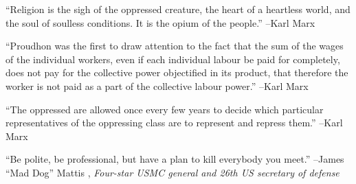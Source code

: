 \documentclass{article}%
\begin{document}
\linebreak%
\vspace{1mm}%
\begin{minipage}{\textwidth}%
\flushleft%
“Religion is the sigh of the oppressed creature, the heart of a heartless world, and the soul of soulless conditions. It is the opium of the people.”%
\linebreak%
\vspace{1mm}%
–Karl Marx%
\linebreak%
\vspace{1mm}%
\end{minipage}%
\linebreak%
\vspace{1mm}%
\begin{minipage}{\textwidth}%
\flushleft%
“Proudhon was the first to draw attention to the fact that the sum of the wages of the individual workers, even if each individual labour be paid for completely, does not pay for the collective power objectified in its product, that therefore the worker is not paid as a part of the collective labour power.”%
\linebreak%
\vspace{1mm}%
–Karl Marx%
\linebreak%
\vspace{1mm}%
\end{minipage}%
\linebreak%
\vspace{1mm}%
\begin{minipage}{\textwidth}%
\flushleft%
“The oppressed are allowed once every few years to decide which particular representatives of the oppressing class are to represent and repress them.”%
\linebreak%
\vspace{1mm}%
–Karl Marx%
\linebreak%
\vspace{1mm}%
\end{minipage}%
\linebreak%
\vspace{1mm}%
\begin{minipage}{\textwidth}%
\flushleft%
“Be polite, be professional, but have a plan to kill everybody you meet.”%
\linebreak%
\vspace{1mm}%
–James “Mad Dog” Mattis%
, \textit{Four-star USMC general and 26th US secretary of defense}%
\linebreak%
\vspace{1mm}%
\end{minipage}%
\end{document}
